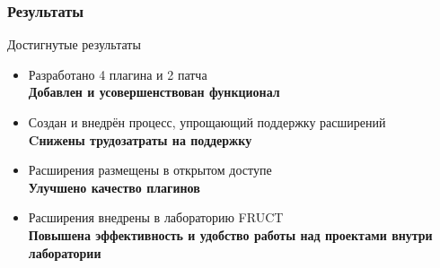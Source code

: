 \documentclass[unicode]{beamer}
\begin{document}
\begin{frame}
\transwipe[direction=90]
\frametitle{Результаты}
\begin{block}{Достигнутые результаты}
\begin{itemize}
  \item Разработано 4 плагина и 2 патча \\ 
    \textbf{Добавлен и усовершенствован функционал}
    \vspace{8pt}
  
  \item Создан и внедрён процесс, упрощающий поддержку расширений \\
    \textbf{Cнижены трудозатраты на поддержку}
    \vspace{8pt}
  
  \item Расширения размещены в открытом доступе \\
    \textbf{Улучшено качество плагинов}
    \vspace{8pt}
  
  \item Расширения внедрены в лабораторию FRUCT \\
    \textbf{Повышена эффективность и удобство работы над проектами внутри
  лаборатории}
\end{itemize}
\end{block}
\end{frame}

\end{document}
